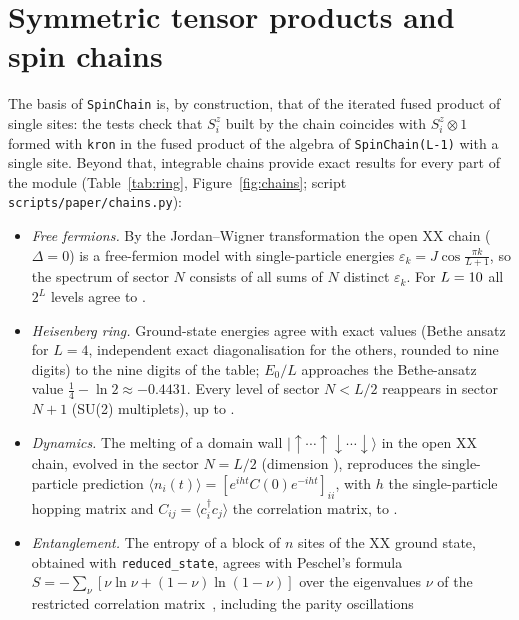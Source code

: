 \documentclass[11pt]{article}
\begin{document}
\section{Symmetric tensor products and spin chains}\label{sec:chains}

The basis of \texttt{SpinChain} is, by construction, that of the iterated fused product of single sites:
the tests check that $S^z_i$ built by the chain coincides with $S^z_i\otimes1$ formed with
\texttt{kron} in the fused product of the algebra of \texttt{SpinChain(L-1)} with a single site. Beyond that, integrable
chains provide exact results for every part of the module (Table~\ref{tab:ring}, Figure~\ref{fig:chains};
script \texttt{scripts/paper/chains.py}):
\begin{itemize}
\item \emph{Free fermions.} By the Jordan--Wigner transformation the open XX chain ($\Delta=0$) is a free-fermion
model with single-particle energies $\varepsilon_k=J\cos\frac{\pi k}{L+1}$, so the spectrum of sector $N$ consists
of all sums of $N$ distinct $\varepsilon_k$. For $L=\IfFileExists{generated/chains.tex}{\ChainFFL}{10}$ all
$2^L$ levels agree to .
\item \emph{Heisenberg ring.} Ground-state energies agree with exact values (Bethe ansatz for $L=4$, independent exact diagonalisation
for the others, rounded to nine digits) to the nine digits of the table; $E_0/L$ approaches the Bethe-ansatz value $\tfrac14-\ln2\approx-0.4431$. Every level of sector
$N<L/2$ reappears in sector $N+1$ (SU(2) multiplets), up to
.
\item \emph{Dynamics.} The melting of a domain wall $|\!\uparrow\cdots\uparrow\downarrow\cdots\downarrow\rangle$ in
the open XX chain, evolved in the sector $N=L/2$ (dimension ), reproduces the single-particle prediction
$\langle n_i(t)\rangle=[e^{iht}C(0)e^{-iht}]_{ii}$, with $h$ the single-particle hopping matrix and
$C_{ij}=\langle c_i^\dagger c_j\rangle$ the correlation matrix, to .
\item \emph{Entanglement.} The entropy of a block of $n$ sites of the XX ground state, obtained with
\texttt{reduced\_state}, agrees with Peschel's formula $S=-\sum_\nu[\nu\ln\nu+(1-\nu)\ln(1-\nu)]$ over the
eigenvalues $\nu$ of the restricted correlation matrix~\cite{peschel2003}, including the parity oscillations

\end{itemize}
\end{document}
